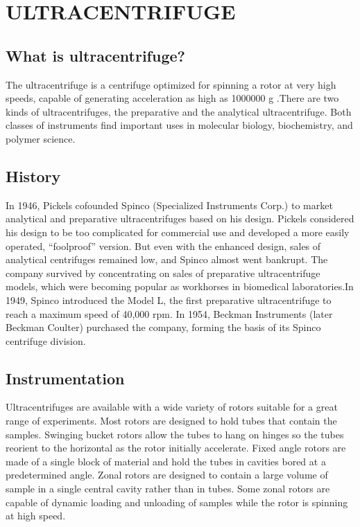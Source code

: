 \documentclass[a4paper,12pt]{report}
\begin{document}
\chapter{ULTRACENTRIFUGE}
\section{What is ultracentrifuge?}
The ultracentrifuge is a centrifuge optimized for spinning a rotor at very high speeds, capable of generating acceleration as high as 1000000 g .There are two kinds of ultracentrifuges, the preparative and the analytical ultracentrifuge. Both classes of instruments find important uses in molecular biology, biochemistry, and polymer science.

\section{History} 

In 1946, Pickels cofounded Spinco (Specialized Instruments Corp.) to market analytical and preparative ultracentrifuges based on his design. Pickels considered his design to be too complicated for commercial use and developed a more easily operated, “foolproof” version. But even with the enhanced design, sales of analytical centrifuges remained low, and Spinco almost went bankrupt. The company survived by concentrating on sales of preparative ultracentrifuge models, which were becoming popular as workhorses in biomedical laboratories.In 1949, Spinco introduced the Model L, the first preparative ultracentrifuge to reach a maximum speed of 40,000 rpm. In 1954, Beckman Instruments (later Beckman Coulter) purchased the company, forming the basis of its Spinco centrifuge division.

\section{Instrumentation}

Ultracentrifuges are available with a wide variety of rotors suitable for a great range of experiments. Most rotors are designed to hold tubes that contain the samples. Swinging bucket rotors allow the tubes to hang on hinges so the tubes reorient to the horizontal as the rotor initially accelerate. Fixed angle rotors are made of a single block of material and hold the tubes in cavities bored at a predetermined angle. Zonal rotors are designed to contain a large volume of sample in a single central cavity rather than in tubes. Some zonal rotors are capable of dynamic loading and unloading of samples while the rotor is spinning at high speed.
\end{document}
